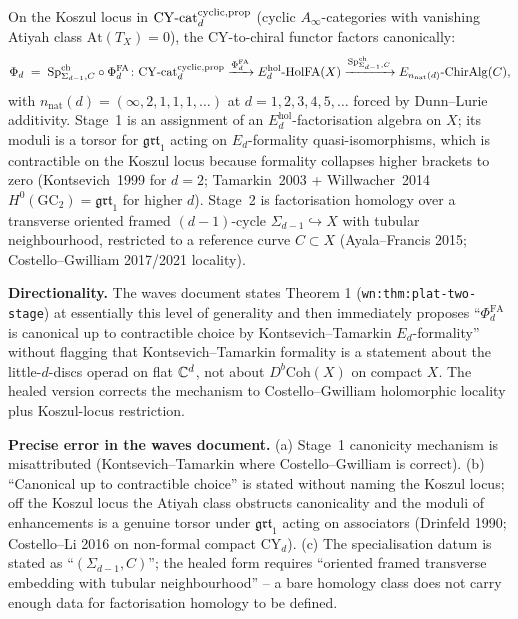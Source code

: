 \begin{theorem}
\ClaimStatusDirectionallyCorrect
\label{wn:thm:H1-two-stage-koszul}
On the Koszul locus in $\mathrm{CY}\text{-}\mathrm{cat}_d^{\mathrm{cyclic,prop}}$ (cyclic
$A_\infty$-categories with vanishing Atiyah class
$\mathrm{At}(T_X) = 0$), the CY-to-chiral functor factors canonically:
\[
\Phi_d \;=\; \mathrm{Sp}^{\mathrm{ch}}_{\Sigma_{d-1}, C}
\circ \Phi^{\mathrm{FA}}_d
\colon \mathrm{CY}\text{-}\mathrm{cat}_d^{\mathrm{cyclic,prop}}
\xrightarrow{\Phi^{\mathrm{FA}}_d} E_d^{\mathrm{hol}}\text{-}\mathrm{HolFA}(X)
\xrightarrow{\mathrm{Sp}^{\mathrm{ch}}_{\Sigma_{d-1}, C}}
E_{n_{\mathrm{nat}}(d)}\text{-}\mathrm{ChirAlg}(C),
\]
with $n_{\mathrm{nat}}(d) = (\infty, 2, 1, 1, 1, \ldots)$ at
$d = 1, 2, 3, 4, 5, \ldots$ forced by Dunn--Lurie additivity.
Stage~1 is an assignment of an $E_d^{\mathrm{hol}}$-factorisation
algebra on $X$; its moduli is a torsor for
$\mathfrak{grt}_1$ acting on $E_d$-formality quasi-isomorphisms, which
is contractible on the Koszul locus because formality collapses higher
brackets to zero (Kontsevich~1999 for $d = 2$; Tamarkin~2003 +
Willwacher~2014 $H^0(\mathrm{GC}_2) = \mathfrak{grt}_1$ for higher $d$).
Stage~2 is factorisation homology over a transverse oriented framed
$(d{-}1)$-cycle $\Sigma_{d-1} \hookrightarrow X$ with tubular
neighbourhood, restricted to a reference curve $C \subset X$
(Ayala--Francis 2015; Costello--Gwilliam 2017/2021 locality).
\end{theorem}

\textbf{Directionality.} The waves document states Theorem 1
(\verb|wn:thm:plat-two-stage|) at essentially this level of generality
and then immediately proposes ``$\Phi^{\mathrm{FA}}_d$ is canonical up
to contractible choice by Kontsevich--Tamarkin $E_d$-formality''
without flagging that Kontsevich--Tamarkin formality is a statement
about the little-$d$-discs operad on flat $\mathbb{C}^d$, not about
$D^b\mathrm{Coh}(X)$ on compact $X$. The healed version corrects the
mechanism to Costello--Gwilliam holomorphic locality plus Koszul-locus
restriction.

\textbf{Precise error in the waves document.} (a) Stage~1 canonicity
mechanism is misattributed (Kontsevich--Tamarkin where
Costello--Gwilliam is correct). (b) ``Canonical up to contractible
choice'' is stated without naming the Koszul locus; off the Koszul
locus the Atiyah class obstructs canonicality and the moduli of
enhancements is a genuine torsor under $\mathfrak{grt}_1$ acting on
associators (Drinfeld 1990; Costello--Li 2016 on non-formal compact
CY$_d$). (c) The specialisation datum is stated as ``$(\Sigma_{d-1}, C)$'';
the healed form requires ``oriented framed transverse embedding with
tubular neighbourhood'' -- a bare homology class does not carry enough
data for factorisation homology to be defined.

